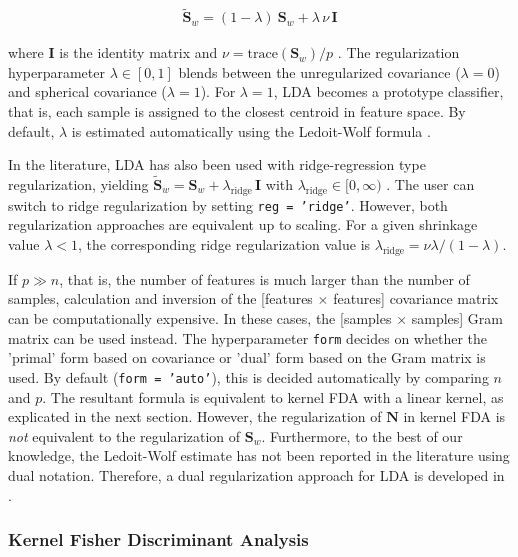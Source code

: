 \documentclass[utf8]{frontiersSCNS} %
\newcommand{\I}{\mathbf{I}}
\renewcommand{\S}{\mathbf{S}}
\newcommand{\ttt}[1]{\texttt{#1}}
\begin{document}
\begin{align}
\label{eq:shrinkage}
\widetilde{\S}_w = (1-\lambda)\ \S_w + \lambda\,\nu\,\I
\end{align}

where $\I$ is the identity matrix and $\nu = \text{trace}(\S_w)/p$ \citep{Blankertz2011}. The regularization hyperparameter $\lambda\in [0,1]$ blends between the unregularized covariance ($\lambda=0$) and spherical covariance ($\lambda=1$). For $\lambda=1$, LDA becomes a prototype classifier, that is, each sample is assigned to the closest centroid in feature space. By default, $\lambda$ is estimated automatically using the Ledoit-Wolf formula \citep{Ledoit2003HoneyMatrix,Blankertz2011}.

In the literature, LDA has also been used with ridge-regression type regularization, yielding $\widetilde{\S}_w = \S_w + \lambda_\text{ridge}\,\I$ with $\lambda_\text{ridge}\in [0,\infty)$ \citep{Friedman1989RegularizedAnalysis}. The user can switch to ridge regularization by setting \ttt{reg = 'ridge'}. However, both regularization approaches are equivalent up to scaling. For a given shrinkage value $\lambda<1$, the corresponding ridge regularization value is $\lambda_\text{ridge} = \nu\lambda / (1-\lambda)$.

If $p \gg n$, that is, the number of features is much larger than the number of samples, calculation and inversion of the [features $\times$ features] covariance matrix can be computationally expensive. In these cases, the [samples $\times$ samples] Gram matrix can be used instead. The hyperparameter \ttt{form} decides on whether the 'primal' form based on covariance or 'dual' form based on the Gram matrix is used. By default (\ttt{form = 'auto'}), this is decided automatically by comparing $n$ and  $p$. The resultant formula is equivalent to kernel FDA with a linear kernel, as explicated in the next section. However, the regularization of $\mathbf{N}$ in  kernel FDA is \textit{not} equivalent to the regularization of $\S_w$. Furthermore, to the best of our knowledge, the Ledoit-Wolf estimate has not been reported in the literature using dual notation. Therefore, a dual regularization approach for LDA is developed in .


\subsubsection{Kernel Fisher Discriminant Analysis}
\end{document}
